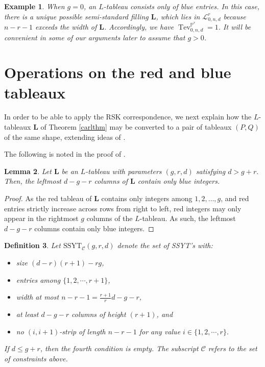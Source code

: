 \documentclass[12pt]{amsart}
\def\bP{\mathbb{P}}
\def\cL{\mathcal{L}}
\def\bL{\mathbf{L}}
\DeclareMathOperator{\Tev}{Tev}
\newtheorem{definition}{Definition}[section]
\newtheorem{example}[definition]{Example}
\newtheorem{lemma}[definition]{Lemma}
\begin{document}
\begin{example}
    When $g=0$, an $L$-tableau consists only of blue entries. In this case, there is a unique possible semi-standard filling $\bL$, which lies in $\cL^{r}_{0,n,d}$ because $n-r-1$ exceeds the width of $\bL$. Accordingly, we have $\Tev^{\bP^r}_{0,n,d}=1$. It will be convenient in some of our arguments later to assume that $g>0$.
\end{example}

\section{Operations on the red and blue tableaux}\label{sec:tableaux_operations}

In order to be able to apply the RSK correspondence, we next explain how the $L$-tableaux $\bL$ of Theorem \ref{carlthm} may be converted to a pair of tableaux $(P,Q)$ of the same shape, extending ideas of \cite{GenRSK}.

The following is noted in the proof of \cite[Lemma~3.4]{GenRSK}.

\begin{lemma}
\label{bwalemma}
Let $\bL$ be an $L$-tableau with parameters $(g,r,d)$ satisfying $d>g+r.$ Then, the leftmost $d-g-r$ columns of $\bL$ contain only blue integers.
\end{lemma}
\begin{proof}
As the red tableau of $\bL$ contains only integers among $1,2,\ldots,g$, and red entries strictly increase across rows from right to left, red integers may only appear in the rightmost $g$ columns of the $L$-tableau. As such, the leftmost $d-g-r$ columns contain only blue integers.
\end{proof}


\begin{definition}\label{cdef}
    Let $\text{SSYT}_\mathcal{C}(g,r,d)$ denote the set of SSYT's with:
    \begin{itemize}
    \item  size $(d-r)(r+1)-rg$,
    \item  entries among $\{1,2,\cdots, r+1\}$,
    \item  width at most $n-r-1=\frac{r+1}{r}d-g-r$,
    \item  at least $d-g-r$ columns of height $(r+1)$, and
    \item  no $(i,i+1)$-strip of length $n-r-1$ for any value $i\in \{1,2,\cdots, r\}.$
    \end{itemize}
If $d\le g+r$, then the fourth condition is empty. The subscript $\mathcal{C}$ refers to the set of constraints above.
\end{definition}
\end{document}
